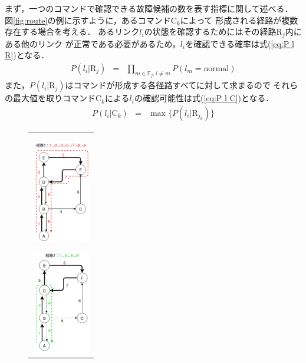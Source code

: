\documentclass[11pt]{jsarticle}%
\begin{document}
\begin{multicols}{2}
 まず，一つのコマンドで確認できる故障候補の数を表す指標に関して述べる．
 図\ref{fig:route}の例に示すように，あるコマンドC$_k$によって
 形成される経路が複数存在する場合を考える．%
 あるリンク$l_i$の状態を確認するためにはその経路$\text{R}_j$内にある他のリンク
 が正常である必要があるため，$l_i$を確認できる確率は式(\ref{eq:P l R})となる．
 \begin{eqnarray}
  P(l_{i} | \text{R}_j) &=& \prod_{m\in\mathbb{F}_j,i\neq m} P(l_{m} = \text{normal})
  \label{eq:P l R}
\end{eqnarray}
 また，$P(l_{i} | \text{R}_j)$はコマンドが形成する各径路すべてに対して求まるので
 それらの最大値を取りコマンドC$_k$による$l_i$の確認可能性は式(\ref{eq:P l C})となる．
\begin{eqnarray}
  P(l_i|\text{C}_k) &=& \max  \{ P(l_i|\text{R}_{j_k})\} \label{eq:P l C}
\end{eqnarray}
\vspace{-1zh}
\begin{figure}[H]
  \centering
     \begin{tabular}{c}
        \begin{minipage}{0.30\hsize}
        \centering
        \includegraphics[height=4.5cm]{../figure/route1.png}
           \label{fig:route1}
        \end{minipage}
        \begin{minipage}{0.30\hsize}
        \centering
        \includegraphics[height=4.5cm]{../figure/route2.png}

\end{minipage}
\end{tabular}
\end{figure}
\end{multicols}
\end{document}
